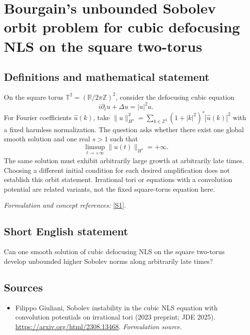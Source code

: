 \documentclass[11pt]{article}
\begin{document}
\section*{\texorpdfstring{Bourgain's unbounded Sobolev orbit problem for cubic defocusing NLS on the square two-torus}{Bourgain's unbounded Sobolev orbit problem for cubic defocusing NLS on the square two-torus}}\label{30006898}
\subsection{Definitions and mathematical statement}
On the square torus $\mathbb T^2=({\mathbb{R}}/2\pi{\mathbb{Z}})^2$, consider the defocusing cubic equation
\[
 i\partial_tu+\Delta u=|u|^2u.
\]
For Fourier coefficients $\widehat u(k)$, take $\|u\|_{H^s}^2=\sum_{k\in{\mathbb{Z}}^2}(1+|k|^2)^s|\widehat u(k)|^2$ with a fixed harmless normalization. The question asks whether there exist one global smooth solution and one real $s>1$ such that
\[
 \limsup_{t\to+\infty}\|u(t)\|_{H^s}=+\infty.
\]
The same solution must exhibit arbitrarily large growth at arbitrarily late times. Choosing a different initial condition for each desired amplification does not establish this orbit statement. Irrational tori or equations with a convolution potential are related variants, not the fixed square-torus equation here.
\par\smallskip\textit{Formulation and concept references:} \href{https://arxiv.org/html/2308.13468}{[S1]}.

\subsection{Short English statement}
Can one smooth solution of cubic defocusing NLS on the square two-torus develop unbounded higher Sobolev norms along arbitrarily late times?
\subsection{Sources}
\begin{itemize}
\item[S1]Filippo Giuliani, Sobolev instability in the cubic NLS equation with convolution potentials on irrational tori (2023 preprint; JDE 2025).
\url{https://arxiv.org/html/2308.13468}.
\textit{Formulation source.}
\end{itemize}
\end{document}
